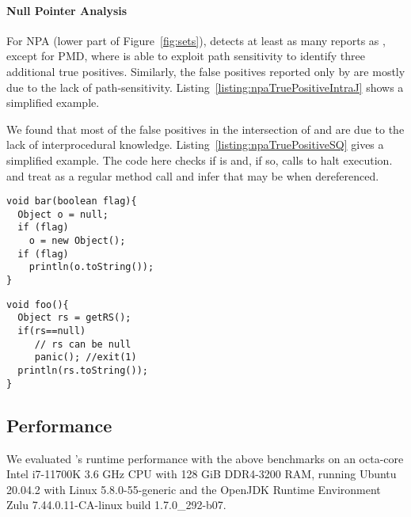 \paragraph{Null Pointer Analysis}
For NPA (lower part of Figure~\ref{fig:sets}),  detects at least as many reports as , except for PMD,
where  is able to exploit path sensitivity to identify three additional true positives.
Similarly, the false positives reported only by  are mostly due to the lack of path-sensitivity.
Listing~\ref{listing:npaTruePositiveIntraJ} shows a simplified example.

We found that most of the false positives in the intersection of  and  are due to the lack of interprocedural knowledge.
Listing~\ref{listing:npaTruePositiveSQ} gives a simplified example.
The code here checks if  is  and, if so, calls  to halt execution.
 and  treat  as a regular method call and infer that  may be  when dereferenced.

\noindent
\begin{minipage}{0.45\textwidth}
\begin{lstlisting}[caption={Simplified false positive reported by {\intraj} }, language=JastAdd, captionpos=b, label=listing:npaTruePositiveIntraJ]
void bar(boolean flag){
  Object o = null;
  if (flag)
    o = new Object();
  if (flag)
    println(o.toString());
}
\end{lstlisting}
\end{minipage}%
\hfill
\begin{minipage}{0.45\textwidth}
\begin{lstlisting}[caption={False positive due to intraprocedural limitations}, language=JastAdd, captionpos=b, label=listing:npaTruePositiveSQ]
void foo(){
  Object rs = getRS();
  if(rs==null)
     // rs can be null
     panic(); //exit(1)
  println(rs.toString());
}
\end{lstlisting}
\end{minipage}%

\subsection{Performance}
We evaluated {\intraj}'s runtime performance with the above benchmarks
on an octa-core Intel i7-11700K 3.6 GHz CPU with 128 GiB DDR4-3200 RAM, running Ubuntu 20.04.2 with Linux 5.8.0-55-generic
and the OpenJDK Runtime Environment Zulu 7.44.0.11-CA-linux build 1.7.0\_292-b07.

